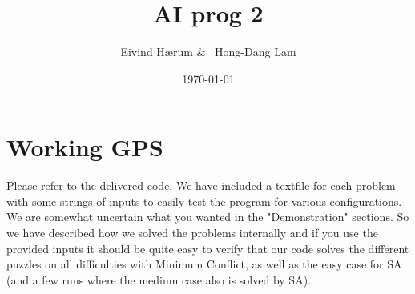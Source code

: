 \documentclass[12pt, a4paper]{article}
\title{AI prog 2}
\author{Eivind Hærum \& \ Hong-Dang Lam}
\date{\today} %
\begin{document}
\maketitle
% 
% 
 
\newpage
\tableofcontents
\newpage
 
\section{Working GPS}
Please refer to the delivered code.
We have included a textfile for each problem with some strings of inputs to easily test the program for various configurations. We are somewhat uncertain what you wanted in the "Demonstration" sections. So we have described how we solved the problems internally and if you use the provided inputs it should be quite easy to verify that our code solves the different puzzles on all difficulties with Minimum Conflict, as well as the easy case for SA (and a few runs where the medium case also is solved by SA).
\end{document}
